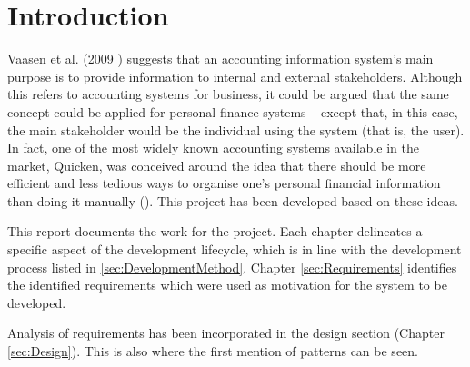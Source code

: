 \section{Introduction} \label{sec:Introduction}

Vaasen et al. (2009 \cite[cited][p.~8]{Boczko:2012:IAI:2331376}) suggests that
an accounting information system's main purpose is to provide information to
internal and external stakeholders. Although this refers to accounting systems
for business, it could be argued that the same concept could be applied for
personal finance systems -- except that, in this case, the main stakeholder
would be the individual using the system (that is, the user). In fact, one of
the most widely known accounting systems available in the market,
Quicken\texttrademark, was conceived around the idea that there should be more
efficient and less tedious ways to organise one's personal financial
information than doing it manually (\cite{quicken2017about}). This project has
been developed based on these ideas.

This report documents the work for the project. Each chapter delineates a
specific aspect of the development lifecycle, which is in line with the
development process listed in \ref{sec:DevelopmentMethod}. Chapter
\ref{sec:Requirements} identifies the identified requirements which were used
as motivation for the system to be developed.

Analysis of requirements has been incorporated in the design section (Chapter
\ref{sec:Design}). This is also where the first mention of patterns can be
seen.
